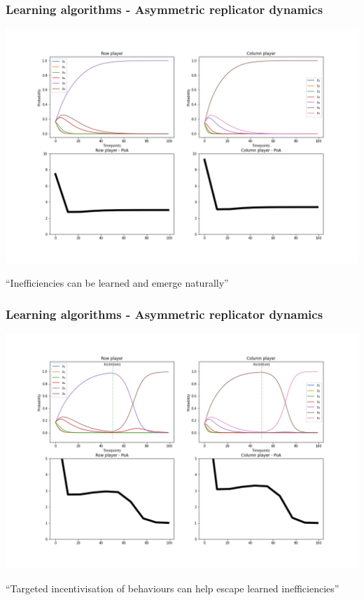 \begin{frame}
    \frametitle{Learning algorithms - Asymmetric replicator dynamics}

    \includegraphics[scale=0.28]{Bin/ARD_game.png}
    
\end{frame}

\begin{frame}
    \centering
    \Huge{
    ``Inefficiencies can be learned and emerge naturally''
    }
\end{frame}


\begin{frame}
    \frametitle{Learning algorithms - Asymmetric replicator dynamics}

    \includegraphics[scale=0.28]{Bin/ARD_penalty_game.png}
    
\end{frame}


\begin{frame}
    \centering
    \Huge{
    ``Targeted incentivisation of behaviours can help escape learned inefficiencies''
    }
\end{frame}
